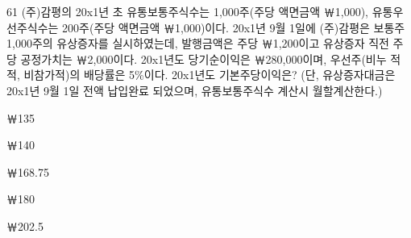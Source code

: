 \begin{question}{61}
(주)감평의 20x1년 초 유통보통주식수는 1,000주(주당 액면금액 ￦1,000), 유통우선주식수는 200주(주당 액면금액 ￦1,000)이다. 20x1년 9월 1일에 (주)감평은 보통주 1,000주의 유상증자를 실시하였는데, 발행금액은 주당 ￦1,200이고 유상증자 직전 주당 공정가치는 ￦2,000이다. 20x1년도 당기순이익은 ￦280,000이며, 우선주(비누 적적, 비참가적)의 배당률은 5\%이다. 20x1년도 기본주당이익은? (단, 유상증자대금은 20x1년 9월 1일 전액 납입완료 되었으며, 유통보통주식수 계산시 월할계산한다.)
\begin{choices}
  \item ￦135
  \item ￦140
  \item ￦168.75
  \item ￦180
  \item ￦202.5
\end{choices}
\end{question}
